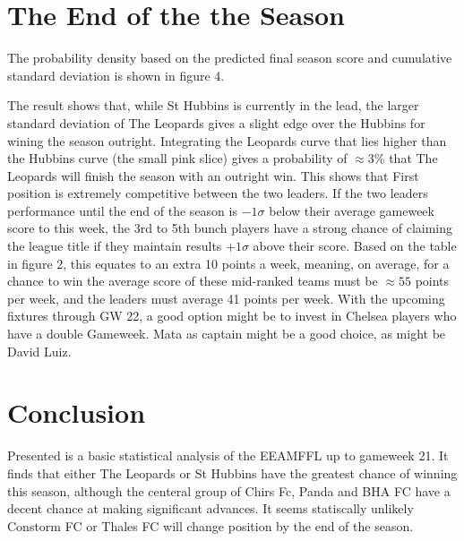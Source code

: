 \documentclass[aps,prl,twocolumn,showpacs,superscriptaddress,groupedaddress]{revtex4}  %
\begin{document}
\section{The End of the the Season}

The probability density based on the predicted final season score and cumulative standard deviation is shown in figure 4.

The result shows that, while St Hubbins is currently in the lead, the larger standard deviation of The Leopards gives a slight edge over the Hubbins for wining the season outright. Integrating the Leopards curve that lies higher than the Hubbins curve (the small pink slice) gives a probability of $\approx 3\%$ that The Leopards will finish the season with an outright win. This shows that First position is extremely competitive between the two leaders. If the two leaders performance until the end of the season is $-1\sigma$ below their average gameweek score to this week, the 3rd to 5th bunch players have a strong chance of claiming the league title if they maintain results $+1\sigma$ above their score. Based on the table in figure 2, this equates to an extra 10 points a week, meaning, on average, for a chance to win the average score of these mid-ranked teams must be $\approx 55$ points per week, and the leaders must average 41 points per week. With the upcoming fixtures through GW 22, a good option might be to invest in Chelsea players who have a double Gameweek. Mata as captain might be a good choice, as might be David Luiz. 
\section{Conclusion}
Presented is a basic statistical analysis of the EEAMFFL up to gameweek 21. It finds that either The Leopards or St Hubbins have the greatest chance of winning this season, although the centeral group of Chirs Fc, Panda and BHA FC have a decent chance at making significant advances. It seems statiscally unlikely Constorm FC or Thales FC will change position by the end of the season.
\end{document}
